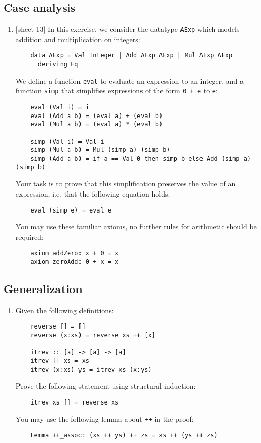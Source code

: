 \documentclass{article}
\def\code#1{\texttt{#1}}
\begin{document}
\subsection{Case analysis}
\begin{enumerate}
    \item {[sheet 13]} In this exercise, we consider the datatype \code{AExp} which models addition and multiplication on integers:
        \begin{verbatim}
    data AExp = Val Integer | Add AExp AExp | Mul AExp AExp
      deriving Eq
        \end{verbatim}
        We define a function \code{eval} to evaluate an expression to an integer, and a function \code{simp} that simplifies expressions of the form \code{0 + e} to \code{e}:
        \begin{verbatim}
    eval (Val i) = i
    eval (Add a b) = (eval a) + (eval b)
    eval (Mul a b) = (eval a) * (eval b)

    simp (Val i) = Val i
    simp (Mul a b) = Mul (simp a) (simp b)
    simp (Add a b) = if a == Val 0 then simp b else Add (simp a) (simp b)
        \end{verbatim}
        Your task is to prove that this simplification preserves the value of an expression, i.e. that the following equation holds:
        \begin{verbatim}
    eval (simp e) = eval e
        \end{verbatim}
        You may use these familiar axioms, no further rules for arithmetic should be required:
        \begin{verbatim}
    axiom addZero: x + 0 = x
    axiom zeroAdd: 0 + x = x
        \end{verbatim}
\end{enumerate}

\subsection{Generalization}
\begin{enumerate}
    \item Given the following definitions:
        \begin{verbatim}
    reverse [] = []
    reverse (x:xs) = reverse xs ++ [x]

    itrev :: [a] -> [a] -> [a]
    itrev [] xs = xs
    itrev (x:xs) ys = itrev xs (x:ys)
        \end{verbatim}
        Prove the following statement using structural induction:
        \begin{verbatim}
    itrev xs [] = reverse xs
        \end{verbatim}
        You may use the following lemma about \code{++} in the proof:
        \begin{verbatim}
    Lemma ++_assoc: (xs ++ ys) ++ zs = xs ++ (ys ++ zs)
        \end{verbatim}
\end{enumerate}
\end{document}
